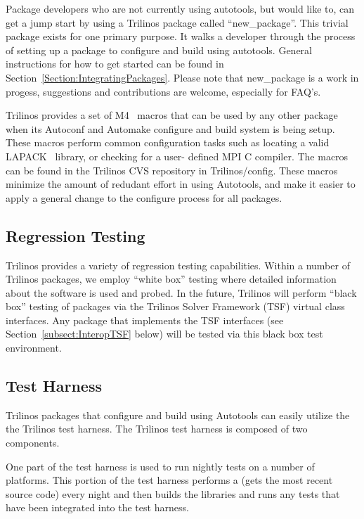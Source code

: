 \documentclass[12pt,strict]{TrilinosDevGuide}
\begin{document}
Package developers who are not currently using autotools, but would like
to, can get a jump start by using a Trilinos package called 
``new\_package''.  This trivial package exists for one primary purpose.  
It walks a developer through the process of setting up a package to 
configure and build using autotools.  General instructions for how to get 
started can be found in Section~\ref{Section:IntegratingPackages}.  Please 
note that new\_package is a work in progess, suggestions and contributions are 
welcome, especially for FAQ's.

Trilinos provides a set of M4~\cite{M4} macros that can be used by any other
package when its Autoconf and Automake configure and build system is being 
setup.  These macros perform common configuration tasks such as
locating a valid LAPACK~\cite{lapack} library, or checking for a user-
defined MPI C compiler.  The macros can be found in the Trilinos CVS 
repository in Trilinos/config.  These macros minimize the amount of redudant
 effort in using Autotools, and make it easier to apply a general change to 
the configure process for all packages.
\subsection{Regression Testing}
Trilinos provides a variety of regression
testing capabilities.  Within a number of Trilinos packages, we employ
``white box'' testing where detailed information about the software is
used and probed.  In the future, Trilinos will perform ``black box'' testing
of packages via the Trilinos Solver Framework (TSF) virtual class
interfaces.  Any package that implements the TSF interfaces (see
Section~\ref{subsect:InteropTSF} below) will be tested via this black box
test environment.

\subsection{Test Harness}
\label{subsect:TestHarness}

Trilinos packages that configure and build using Autotools can easily 
utilize the the Trilinos test harness.  The Trilinos test harness is composed 
of two components.  

One part of the test harness is used to run nightly tests on a number of 
platforms.  This portion of the test harness performs a 
 (gets the most recent source code) every night and 
then builds the libraries and runs any tests that have been integrated into 
the test harness.  
\end{document}
